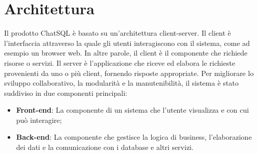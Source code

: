 \section{Architettura}

\par Il prodotto ChatSQL è basato su un'architettura client-server. Il client è l'interfaccia attraverso la quale gli utenti interagiscono con il sistema, come ad esempio un browser web. In altre parole, il client è il componente che richiede risorse o servizi. Il server è l'applicazione che riceve ed elabora le richieste provenienti da uno o più client, fornendo risposte appropriate. Per migliorare lo sviluppo collaborativo, la modularità e la manutenibilità, il sistema è stato suddiviso in due componenti principali:
\begin{itemize}
  \item \textbf{Front-end}: La componente di un sistema che l'utente visualizza e con cui può interagire;
  \item \textbf{Back-end}: La componente che gestisce la logica di business, l'elaborazione dei dati e la comunicazione con i database e altri servizi.
\end{itemize}